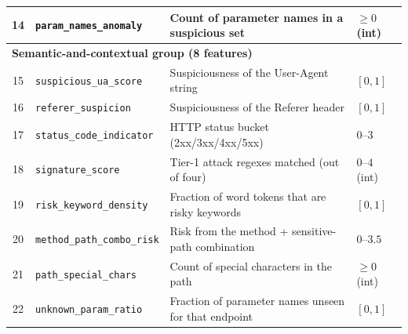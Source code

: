 \documentclass[../main.tex]{subfiles}
\begin{document}
\begin{table}[H]
\begin{tabular}{|c|l|p{5.3cm}|l|}
    14 & \texttt{param\_names\_anomaly}             & Count of parameter names in a suspicious set            & $\geq 0$ (int) \\
    \hline
    \multicolumn{4}{|l|}{\textbf{Semantic-and-contextual group (8 features)}} \\
    \hline
    15 & \texttt{suspicious\_ua\_score}     & Suspiciousness of the User-Agent string         & $[0,1]$ \\
    16 & \texttt{referer\_suspicion}        & Suspiciousness of the Referer header            & $[0,1]$ \\
    17 & \texttt{status\_code\_indicator}   & HTTP status bucket (2xx/3xx/4xx/5xx)            & $0$–$3$ \\
    18 & \texttt{signature\_score}          & Tier-1 attack regexes matched (out of four)     & $0$–$4$ (int) \\
    19 & \texttt{risk\_keyword\_density}    & Fraction of word tokens that are risky keywords & $[0,1]$ \\
    20 & \texttt{method\_path\_combo\_risk} & Risk from the method + sensitive-path combination & $0$–$3.5$ \\
    21 & \texttt{path\_special\_chars}      & Count of special characters in the path          & $\geq 0$ (int) \\
    22 & \texttt{unknown\_param\_ratio}     & Fraction of parameter names unseen for that endpoint & $[0,1]$ \\
    \hline
  \end{tabular}
\end{table}
\end{document}
